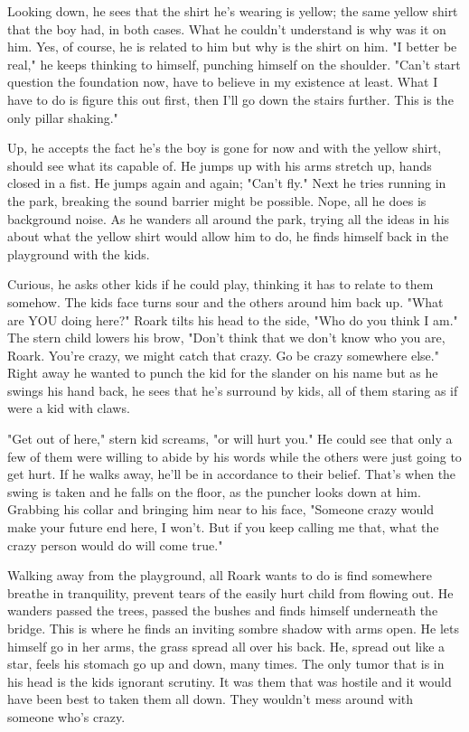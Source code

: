         Looking down, he sees that the shirt he's wearing is yellow; the same yellow shirt that the boy had, in both cases. What he couldn't
    understand is why was it on him. Yes, of course, he is related to him but why is the shirt on him. "I better be real," he keeps thinking
    to himself, punching himself on the shoulder. "Can't start question the foundation now, have to believe in my existence at least. What
    I have to do is figure this out first, then I'll go down the stairs further. This is the only pillar shaking." 

        Up, he accepts the fact he's the boy is gone for now and with the yellow shirt, should see what its capable of. He jumps up with his
    arms stretch up, hands closed in a fist. He jumps again and again; "Can't fly." Next he tries running in the park, breaking the sound
    barrier might be possible. Nope, all he does is background noise. As he wanders all around the park, trying all the ideas in his about what
    the yellow shirt would allow him to do, he finds himself back in the playground with the kids.

       Curious, he asks other kids if he could play, thinking it has to relate to them somehow. The kids face turns sour and the others around
    him back up. "What are YOU doing here?" Roark tilts his head to the side, "Who do you think I am." The stern child lowers his brow, "Don't
    think that we don't know who you are, Roark. You're crazy, we might catch that crazy. Go be crazy somewhere else." Right away he wanted
    to punch the kid for the slander on his name but as he swings his hand back, he sees that he's surround by kids, all of them staring as if
    were a kid with claws.

        "Get out of here," stern kid screams, "or will hurt you." He could see that only a few of them were willing to abide by his words while
    the others were just going to get hurt. If he walks away, he'll be in accordance to their belief. That's when the swing is taken and he falls
    on the floor, as the puncher looks down at him. Grabbing his collar and bringing him near to his face, "Someone crazy would make your future
    end here, I won't. But if you keep calling me that, what the crazy person would do will come true."

        Walking away from the playground, all Roark wants to do is find somewhere breathe in tranquility, prevent tears of the easily hurt child
    from flowing out. He wanders passed the trees, passed the bushes and finds himself underneath the bridge. This is where he finds an inviting
    sombre shadow with arms open. He lets himself go in her arms, the grass spread all over his back. He, spread out like a star, feels his
    stomach go up and down, many times. The only tumor that is in his head is the kids ignorant scrutiny. It was them that was hostile and it
    would have been best to taken them all down. They wouldn't mess around with someone who's crazy.

